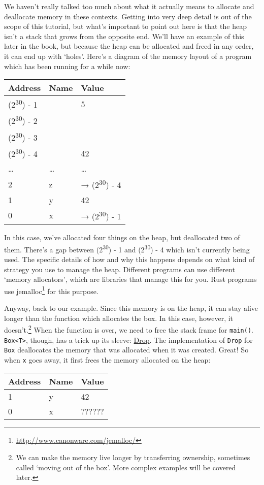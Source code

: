 \documentclass[a4paper,]{book}
\renewcommand{\href}[2]{#2\footnote{\url{#1}}}
\begin{document}
We haven't really talked too much about what it actually means to
allocate and deallocate memory in these contexts. Getting into very deep
detail is out of the scope of this tutorial, but what's important to
point out here is that the heap isn't a stack that grows from the
opposite end. We'll have an example of this later in the book, but
because the heap can be allocated and freed in any order, it can end up
with `holes'. Here's a diagram of the memory layout of a program which
has been running for a while now:

\begin{longtable}[c]{@{}lll@{}}
\toprule
Address & Name & Value\tabularnewline
\midrule
\endhead
(2\textsuperscript{30}) - 1 & & 5\tabularnewline
(2\textsuperscript{30}) - 2 & &\tabularnewline
(2\textsuperscript{30}) - 3 & &\tabularnewline
(2\textsuperscript{30}) - 4 & & 42\tabularnewline
\ldots{} & \ldots{} & \ldots{}\tabularnewline
2 & z & → (2\textsuperscript{30}) - 4\tabularnewline
1 & y & 42\tabularnewline
0 & x & → (2\textsuperscript{30}) - 1\tabularnewline
\bottomrule
\end{longtable}

In this case, we've allocated four things on the heap, but deallocated
two of them. There's a gap between (2\textsuperscript{30}) - 1 and
(2\textsuperscript{30}) - 4 which isn't currently being used. The
specific details of how and why this happens depends on what kind of
strategy you use to manage the heap. Different programs can use
different `memory allocators', which are libraries that manage this for
you. Rust programs use
\href{http://www.canonware.com/jemalloc/}{jemalloc} for this purpose.

Anyway, back to our example. Since this memory is on the heap, it can
stay alive longer than the function which allocates the box. In this
case, however, it doesn't.\footnote{We can make the memory live longer
  by transferring ownership, sometimes called `moving out of the box'.
  More complex examples will be covered later.} When the function is
over, we need to free the stack frame for \texttt{main()}.
\texttt{Box\textless{}T\textgreater{}}, though, has a trick up its
sleeve: \protect\hyperlink{sec--drop}{Drop}. The implementation of
\texttt{Drop} for \texttt{Box} deallocates the memory that was allocated
when it was created. Great! So when \texttt{x} goes away, it first frees
the memory allocated on the heap:

\begin{longtable}[c]{@{}lll@{}}
\toprule
Address & Name & Value\tabularnewline
\midrule
\endhead
1 & y & 42\tabularnewline
0 & x & ??????\tabularnewline
\bottomrule
\end{longtable}
\end{document}
